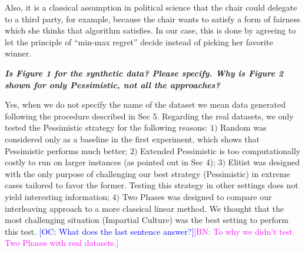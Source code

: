 \documentclass{article}
\newcommand{\commentOC}[1]{\textcolor{blue}{\small$\big[$OC: #1$\big]$}}
\newcommand{\commentBN}[1]{\textcolor{magenta}{\small$\big[$BN: #1$\big]$}}
\begin{document}
Also, it is a classical assumption in political science that the chair could delegate to a third party, for example, because the chair wants to satisfy a form of fairness which she thinks that algorithm satisfies. In our case, this is done by agreeing to let the principle of “min-max regret” decide instead of picking her favorite winner.

\textit{\textbf{}}


\textit{\textbf{Is Figure 1 for the synthetic data? Please specify. Why is Figure 2 shown for only Pessimistic, not all the approaches?}}

Yes, when we do not specify the name of the dataset we mean data generated following the procedure described in Sec 5. Regarding the real datasets, we only tested the Pessimistic strategy for the following reasons: $1)$ Random was considered only as a baseline in the first experiment, which shows that Pessimistic performs much better; $2)$ Extended Pessimistic is too computationally costly to run on larger instances (as pointed out in Sec 4); $3)$ Elitist was designed with the only purpose of challenging our best strategy (Pessimistic) in extreme cases tailored to favor the former. Testing this strategy in other settings does not yield interesting information; $4)$ Two Phases was designed to compare our interleaving approach to a more classical linear method. We thought that the most challenging situation (Impartial Culture) was the best setting to perform this test. \commentOC{What does the last sentence answer?}\commentBN{To why we didn't test Two Phases with real datasets.}
\end{document}
